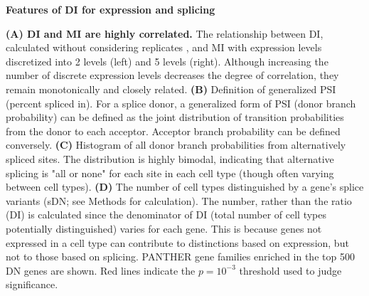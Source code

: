 \textbf{Features of DI for expression and splicing}

\textbf{(A) DI and MI are highly correlated.} The relationship between DI, calculated without considering replicates%
, and MI with expression levels discretized into 2 levels (left) and 5 levels (right). Although increasing the number of discrete expression levels decreases the degree of correlation, they remain monotonically and closely related.
\textbf{(B)} Definition of generalized PSI (percent spliced in). For a splice donor, a generalized form of PSI (donor branch probability) can be defined as the joint distribution of transition probabilities from the donor to each acceptor. Acceptor branch probability can be defined conversely. 
\textbf{(C)} Histogram of all donor branch probabilities from alternatively spliced sites. The distribution is highly bimodal, indicating that alternative splicing is "all or none" for each site in each cell type (though  often varying between cell types). 
\textbf{(D)} The number of cell types distinguished by a gene's splice variants (sDN; see Methods for calculation). The number, rather than the ratio (DI) is calculated since the denominator of DI (total number of cell types potentially distinguished) varies for each gene. This is because genes not expressed in a cell type can contribute to distinctions based on expression, but not to those based on splicing. PANTHER gene families enriched in the top 500 DN genes are shown. Red lines indicate the $p=10^{-3}$ threshold used to judge significance.
